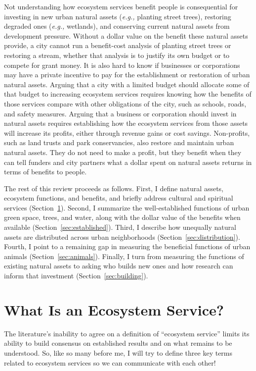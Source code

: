 \documentclass[12pt]{article}
\begin{document}
Not understanding how ecosystem services benefit people is consequential for investing in new urban natural assets (\textit{e.g.,} planting street trees), restoring degraded ones (\textit{e.g.,} wetlands), and conserving current natural assets from development pressure. Without a dollar value on the benefit these natural assets provide, a city cannot run a benefit-cost analysis of planting street trees or restoring a stream, whether that analysis is to justify its own budget or to compete for grant money. It is also hard to know if businesses or corporations may have a private incentive to pay for the establishment or restoration of urban natural assets. Arguing that a city with a limited budget should allocate some of that budget to increasing ecosystem services requires knowing how the benefits of those services compare with other obligations of the city, such as schools, roads, and safety measures. Arguing that a business or corporation should invest in natural assets requires establishing how the ecosystem services from those assets will increase its profits, either through revenue gains or cost savings. Non-profits, such as land trusts and park conservancies, also restore and maintain urban natural assets. They do not need to make a profit, but they benefit when they can tell funders and city partners what a dollar spent on natural assets returns in terms of benefits to people.  

The rest of this review proceeds as follows. First, I define natural assets, ecosystem functions, and benefits, and briefly address cultural and spiritual services (Section~\ref{sec:define}). Second, I summarize the well-established functions of urban green space, trees, and water, along with the dollar value of the benefits when available (Section~\ref{sec:established}). Third, I describe how unequally natural assets are distributed across urban neighborhoods (Section~\ref{sec:distribution}). Fourth, I point to a remaining gap in measuring the beneficial functions of urban animals (Section~\ref{sec:animals}). Finally, I turn from measuring the functions of existing natural assets to asking who builds new ones and how research can inform that investment (Section~\ref{sec:building}).

\section{What Is an Ecosystem Service?}\label{sec:define}
The literature's inability to agree on a definition of ``ecosystem service'' limits its ability to build consensus on established results and on what remains to be understood. So, like so many before me, I will try to define three key terms related to ecosystem services so we can communicate with each other! 
\end{document}
